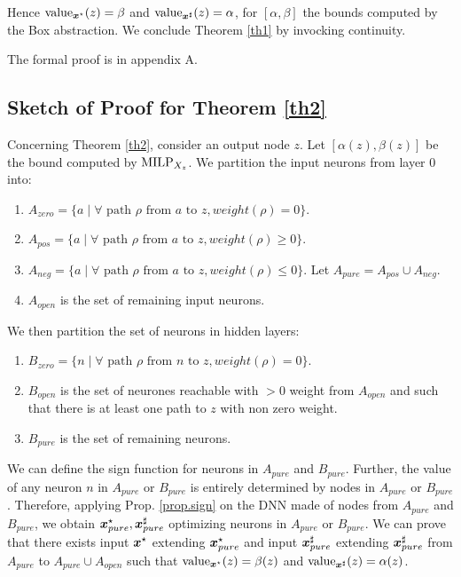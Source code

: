 Hence ${\textrm{value}}_{\boldsymbol{x}^\star}(z)=\beta$ and ${\textrm{value}}_{\boldsymbol{x}^\sharp}(z)=\alpha$,
for $[\alpha, \beta]$ the bounds computed by the Box abstraction. We conclude Theorem \ref{th1} by invocking continuity.

\smallskip
The formal proof is in appendix A.


\subsection{Sketch of Proof for Theorem \ref{th2}}
\label{sec.proofs2}

Concerning Theorem \ref{th2}, consider an output node $z$.
Let $[\alpha(z),\beta(z)]$ be the bound computed by ${\textrm{MILP}}_{X_z}$.
We partition the input neurons from layer $0$ into:
\begin{enumerate}
	\item $A_{zero}= \{a \mid \forall \text{ path $\rho$ from $a$ to } z, weight(\rho)=0\}$.
	\item $A_{pos}= \{a \mid \forall \text{ path $\rho$ from $a$ to } z, weight(\rho)\geq0\}$.
	\item  $A_{neg}= \{a \mid \forall \text{ path $\rho$ from $a$ to } z, weight(\rho)\leq0\}$.
	Let $A_{pure}=A_{pos} \cup A_{neg}$.
	\item $A_{open}$ is the set of remaining input neurons.
\end{enumerate}

We then partition the set of neurons in hidden layers: 
\begin{enumerate}
	\item $B_{zero}= \{n \mid \forall \text{ path $\rho$ from $n$ to } z, weight(\rho)=0\}$.
	\item $B_{open}$ is the set of neurones reachable with $>0$ weight from $A_{open}$ and such that there is at least one path to $z$ with non zero weight.
	\item $B_{pure}$ is the set of remaining neurons.
\end{enumerate}

We can define the sign function for neurons in $A_{pure}$ and $B_{pure}$.
Further, the value of any neuron $n$ in $A_{pure}$ or $B_{pure}$ is entirely determined by 
nodes in $A_{pure}$ or $B_{pure}$. Therefore, applying Prop. \ref{prop.sign} on the DNN
made of nodes from $A_{pure}$ and $B_{pure}$, we obtain 
$\boldsymbol{x}_{pure}^\star,\boldsymbol{x}_{pure}^\sharp$ optimizing neurons in $A_{pure}$ or $B_{pure}$.
We can prove that there exists input 
$\boldsymbol{x}^\star$ extending $\boldsymbol{x}_{pure}^\star$
and input $\boldsymbol{x}_{pure}^\sharp$ extending $\boldsymbol{x}_{pure}^\sharp$
from $A_{pure}$ to $A_{pure} \cup A_{open}$ such that 
${\textrm{value}}_{\boldsymbol{x}^\star}(z)=\beta(z)$ and ${\textrm{value}}_{\boldsymbol{x}^\sharp}(z)=\alpha(z)$.




